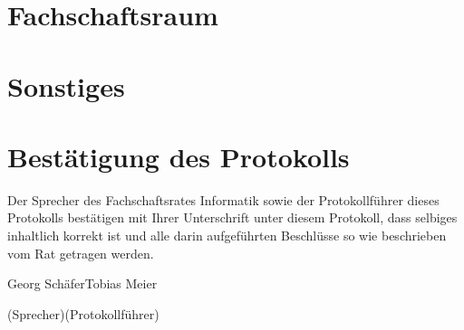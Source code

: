 \documentclass[a4paper, 11pt]{article} %
\newcommand{\TeXer}{Tobias Meier}
\newcommand{\fsiPresident}{Georg Schäfer}
\begin{document}
\section{Fachschaftsraum}

\section{Sonstiges}

\pagebreak
\section{Bestätigung des Protokolls}
Der Sprecher des Fachschaftsrates Informatik sowie der Protokollführer dieses Protokolls bestätigen mit Ihrer Unterschrift unter diesem Protokoll, dass selbiges inhaltlich korrekt ist und alle darin aufgeführten Beschlüsse so wie beschrieben vom Rat getragen werden.
\\

\vspace{3.5cm}
\hrulefill \hfill \hrulefill

\fsiPresident \hfill \TeXer

{\footnotesize (Sprecher)\hfill (Protokollführer)}
\end{document}
